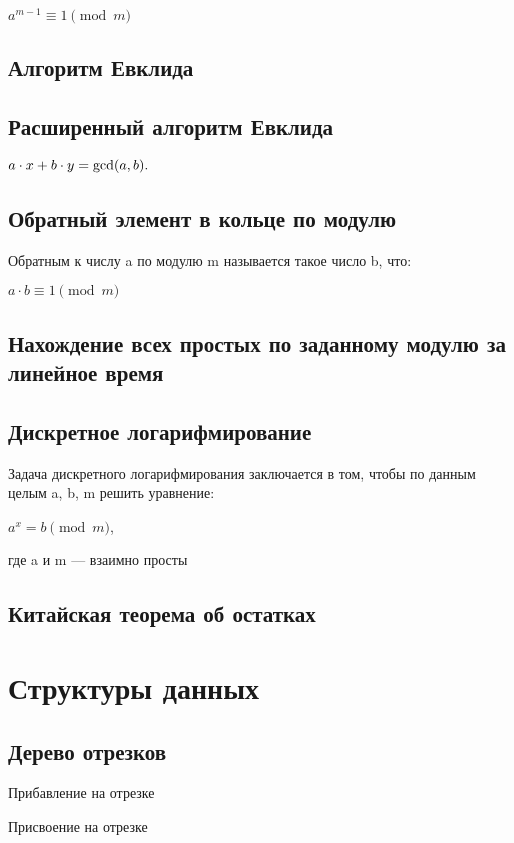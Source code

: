 \documentclass[a4paper]{article}
\begin{document}
\begin{multicols*}{2}
		$a^{m-1} \equiv 1  \pmod m $
		
		\subsection{Алгоритм Евклида}
		
		\subsection{Расширенный алгоритм Евклида}
		$a \cdot x + b \cdot y = {\rm gcd} (a, b).$
		
		\subsection{Обратный элемент в кольце по модулю}
		Обратным к числу a по модулю m называется такое число b, что:
		
		$a \cdot b \equiv 1 \pmod m$
		
		\subsection{Нахождение всех простых по заданному модулю за линейное время}
		
		\subsection{Дискретное логарифмирование}
		Задача дискретного логарифмирования заключается в том, чтобы по данным целым a, b, m решить уравнение:
		
		$a^x = b \pmod m$, 
		
		где a и m — взаимно просты 
		
		\subsection{Китайская теорема об остатках}
		
		
		\section{Структуры данных}
		\subsection{Дерево отрезков}
		
		 Прибавление на отрезке
		 
		 Присвоение на отрезке
		 

\end{multicols*}
\end{document}

